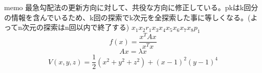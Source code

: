 \documentclass[a4j,twocolumn]{jarticle}
\begin{document}
memo
最急勾配法の更新方向に対して、共役な方向に修正している。pkはk回分の情報を含んでいるため、k回の探索でk次元を全探索した事に等しくなる。(よってn次元の探索はn回以内で終了する)
$x_1 x_2 r_1x_3x_4x_5x_6x_7x_8p_1$
\begin{displaymath}
f(x) = \frac{x^TAx}{x^Tx}
\end{displaymath}
\begin{displaymath}
Ax = \lambda x
\end{displaymath}
\begin{displaymath}
V(x, y, z) = \frac{1}{2}(x^2 + y^2 + z^2) + (x - 1)^2(y - 1)^4
\end{displaymath}
\end{document}
